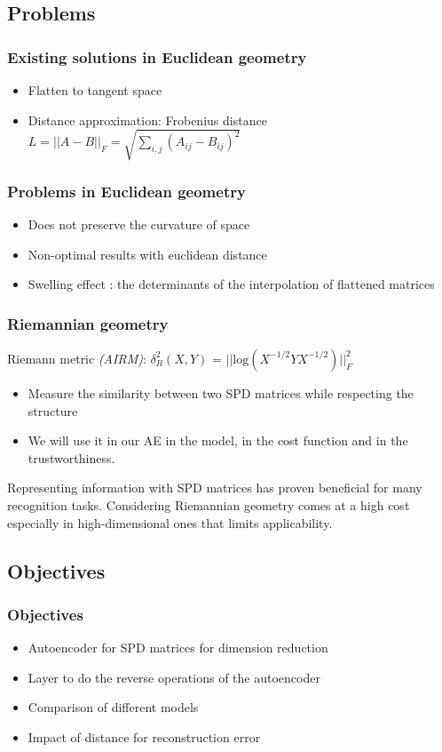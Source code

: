 \documentclass{beamer}
\begin{document}
\subsection{Problems}
\begin{frame}
    \frametitle{Existing solutions in Euclidean geometry}
    \begin{itemize}
    \item Flatten to tangent space
    \item Distance approximation: Frobenius distance
    $ L=||A-B||_F = \sqrt{\sum_{i,j}(A_{ij}-B_{ij})^2}$
    \end{itemize}
\end{frame}
\begin{frame}
\frametitle{Problems in Euclidean geometry}
\begin{itemize}
    \item Does not preserve the curvature of space
    \item Non-optimal results with euclidean distance
    \item Swelling effect : the determinants of the interpolation of flattened matrices
    \end{itemize}
\end{frame}
\begin{frame}
    \frametitle{Riemannian geometry}
    Riemann metric \textit{(AIRM)}: $\delta^2_R(X,Y)$ = $||\text{log}(X^{-1/2}YX^{-1/2})||^2_F$
    \begin{itemize}
        \item Measure the similarity between two SPD matrices while respecting the structure
        \item We will use it in our AE in the model, in the cost function and in the trustworthiness.
    \end{itemize}
    Representing information with SPD matrices has proven beneficial for many recognition tasks. 
    Considering Riemannian geometry comes at a high cost especially in high-dimensional ones that limits applicability.
\end{frame}
\subsection{Objectives}
\begin{frame}
\frametitle{Objectives}
\begin{itemize}
    \item Autoencoder for SPD matrices for dimension reduction
    \item Layer to do the reverse operations of the autoencoder
    \item Comparison of different models
    \item Impact of distance for reconstruction error
\end{itemize}
\end{frame}
\end{document}
